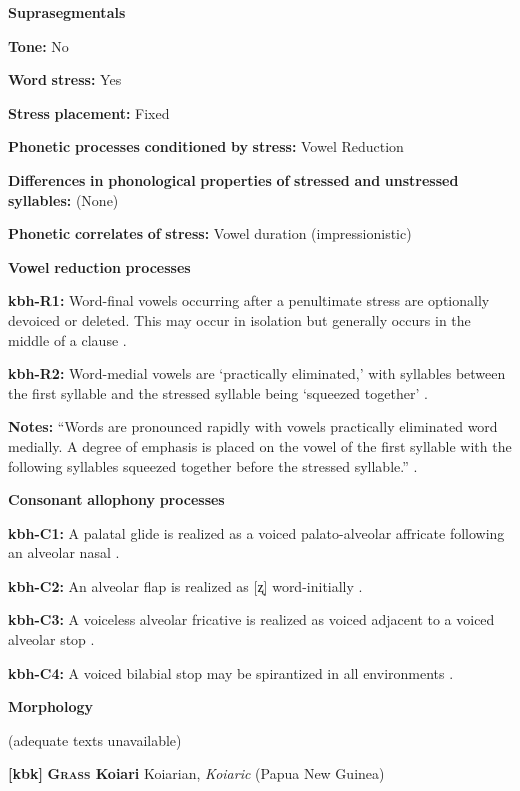 \textbf{Suprasegmentals}

\textbf{Tone:} No

\textbf{Word} \textbf{stress:} Yes

\textbf{Stress} \textbf{placement:} Fixed

\textbf{Phonetic} \textbf{processes} \textbf{conditioned} \textbf{by} \textbf{stress:} Vowel Reduction

\textbf{Differences} \textbf{in} \textbf{phonological} \textbf{properties} \textbf{of} \textbf{stressed} \textbf{and} \textbf{unstressed} \textbf{syllables:} (None)

\textbf{Phonetic} \textbf{correlates} \textbf{of} \textbf{stress:} Vowel duration (impressionistic)

\textbf{Vowel} \textbf{reduction} \textbf{processes}

\textbf{kbh-R1:} Word-final vowels occurring after a penultimate stress are optionally devoiced or deleted. This may occur in isolation but generally occurs in the middle of a clause \citep[86]{Howard1967}.

\textbf{kbh-R2:} Word-medial vowels are ‘practically eliminated,’ with syllables between the first syllable and the stressed syllable being ‘squeezed together’ \citep[86-7]{Howard1967}.

\textbf{Notes:} “Words are pronounced rapidly with vowels practically eliminated word medially. A degree of emphasis is placed on the vowel of the first syllable with the following syllables squeezed together before the stressed syllable.” \citep[86-7]{Howard1967}.

\textbf{Consonant} \textbf{allophony} \textbf{processes}

\textbf{kbh-C1:} A palatal glide is realized as a voiced palato-alveolar affricate following an alveolar nasal \citep{Howard1967}.

\textbf{kbh-C2:} An alveolar flap is realized as [ʐ] word-initially \citep[78]{Howard1967}.

\textbf{kbh-C3:} A voiceless alveolar fricative is realized as voiced adjacent to a voiced alveolar stop \citep[78]{Howard1967}.

\textbf{kbh-C4:} A voiced bilabial stop may be spirantized in all environments \citep[77]{Howard1967}.

\textbf{Morphology}

(adequate texts unavailable)

\textbf{[kbk]}   \textbf{\textsc{Grass} \textbf{Koiari}}    Koiarian, \textit{Koiaric} (Papua New Guinea)

